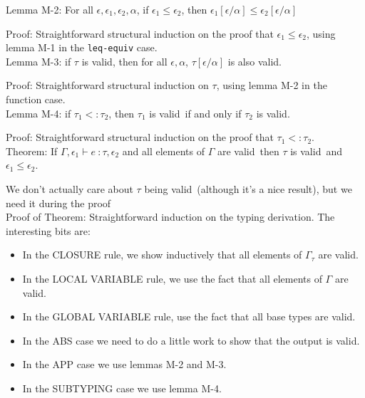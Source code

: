 \documentclass{article}
\newcommand{\oktype}{valid}
\begin{document}
\noindent Lemma M-2: For all $\epsilon, \epsilon_1, \epsilon_2, \alpha$, if $\epsilon_1 \leq \epsilon_2$, then $\epsilon_1[\epsilon/\alpha] \leq \epsilon_2[\epsilon/\alpha]$

\noindent Proof: Straightforward structural induction on the proof that $\epsilon_1 \leq \epsilon_2$, using lemma M-1 in the \texttt{leq-equiv} case.
\\

\noindent Lemma M-3: if $\tau$ is \oktype, then for all $\epsilon, \alpha$, $\tau[\epsilon/\alpha]$ is also \oktype.
 
\noindent Proof: Straightforward structural induction on $\tau$, using lemma M-2 in the function case.
\\

\noindent Lemma M-4: if $\tau_1 <: \tau_2$, then $\tau_1$ is \oktype\ if and only if $\tau_2$ is \oktype.

\noindent Proof: Straightforward structural induction on the proof that $\tau_1 <: \tau_2$.
\\

\noindent Theorem: If $\Gamma, \epsilon_1 \vdash e\ \colon \tau, \epsilon_2$ and all elements of $\Gamma$ are \oktype\, then $\tau$ is \oktype\ and $\epsilon_1 \leq \epsilon_2$.

\noindent We don't actually care about $\tau$ being \oktype\ (although it's a nice result), but we need it during the proof
\\

\noindent Proof of Theorem: Straightforward induction on the typing derivation. The interesting bits are:
\begin{itemize}
	\item In the CLOSURE rule, we show inductively that all elements of $\Gamma_\tau$ are \oktype.
	\item In the LOCAL VARIABLE rule, we use the fact that all elements of $\Gamma$ are \oktype.
	\item In the GLOBAL VARIABLE rule, use the fact that all base types are valid.
	\item In the ABS case we need to do a little work to show that the output is \oktype.
	\item In the APP case we use lemmas M-2 and M-3.
	\item In the SUBTYPING case we use lemma M-4.
\end{itemize}
\end{document}
